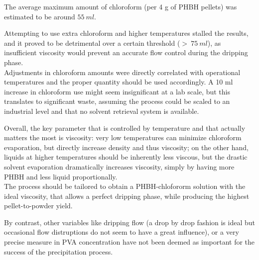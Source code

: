\documentclass[a4paper]{article}
\begin{document}
        The average maximum amount of chloroform (per 4 g of PHBH pellets) was estimated to be around $55 \ ml$. 

        Attempting to use extra chloroform and higher temperatures stalled the 
        results, and it proved to be detrimental over a certain threshold ($ > \ 75 \ ml$), as insufficient 
        viscosity would prevent an accurate flow control during the dripping phase. \\ 

        Adjustments in chloroform amounts were directly correlated with operational temperatures and the proper quantity should 
        be used accordingly. 
        A 10 ml increase in chloroform use might seem insignificant at a lab scale, but this translates to significant waste, 
        assuming the process could be scaled to an industrial level and that no solvent retrieval system is available. 


        Overall, the key parameter that is controlled by temperature and that actually matters the most is viscosity: 
        very low temperatures can minimize chloroform evaporation, 
        but directly increase density and thus viscosity; on the other hand, liquids at higher temperatures should be inherently 
        less viscous, but the drastic solvent evaporation dramatically increases viscosity, simply by having more PHBH and less 
        liquid proportionally. \\ 
        
        The process should be tailored to obtain a PHBH-chlofororm solution with the ideal viscosity, that allows a perfect dripping 
        phase, while producing the highest pellet-to-powder yield. 


        By contrast, other variables like dripping flow (a drop by drop fashion is ideal but occasional 
        flow distruptions do not seem to have a great influence), or a very precise measure in 
        PVA concentration have not been deemed as important for the success of the precipitation process. 
\end{document}
